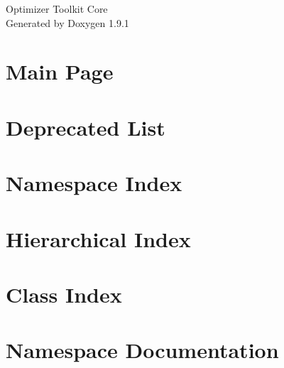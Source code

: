 \let\mypdfximage\pdfximage\def\pdfximage{\immediate\mypdfximage}\documentclass[twoside]{book}
\newcommand{\+}{\discretionary{\mbox{\scriptsize$\hookleftarrow$}}{}{}}
\newcommand{\clearemptydoublepage}{%
  \newpage{\pagestyle{empty}\cleardoublepage}%
}
\begin{document}
\raggedbottom

\hypersetup{pageanchor=false,
             bookmarksnumbered=true,
             pdfencoding=unicode
            }
\begin{titlepage}
\vspace*{7cm}
\begin{center}%
{\Large Optimizer Toolkit Core }\\
\vspace*{1cm}
{\large Generated by Doxygen 1.9.1}\\
\end{center}
\end{titlepage}
\clearemptydoublepage
{}
\tableofcontents
\clearemptydoublepage
{}
\hypersetup{pageanchor=true}

\chapter{Main Page}
\label{index}\hypertarget{index}{}
\chapter{Deprecated List}
\label{deprecated}

\chapter{Namespace Index}

\chapter{Hierarchical Index}

\chapter{Class Index}

\chapter{Namespace Documentation}


\end{document}
